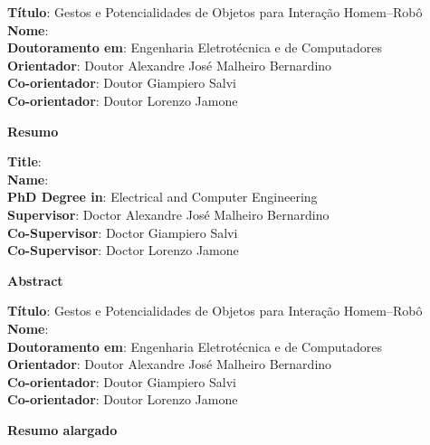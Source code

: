 \documentclass{article}
\newcommand{\alexName}{Alexandre José Malheiro Bernardino}
\newcommand{\giampiName}{Giampiero Salvi}
\newcommand{\loreName}{Lorenzo Jamone}
\newcommand*{\PathFrontmatter}{./1_frontmatter}
\begin{document}
\begin{acronym}
\end{acronym}


\noindent\textbf{Título}: Gestos e Potencialidades de Objetos para Interação Homem--Robô \\
\noindent\textbf{Nome}: \myFullName \\
\noindent\textbf{Doutoramento em}: Engenharia Eletrotécnica e de Computadores \\
\noindent\textbf{Orientador}: Doutor \alexName \\
\noindent\textbf{Co-orientador}: Doutor \giampiName \\
\noindent\textbf{Co-orientador}: Doutor \loreName \\

\bigskip

\noindent\textbf{Resumo}

\bigskip



\newpage

\noindent\textbf{Title}: \myThesisTitle \\
\noindent\textbf{Name}: \myFullName \\
\noindent\textbf{PhD Degree in}: Electrical and Computer Engineering \\
\noindent\textbf{Supervisor}: Doctor \alexName \\
\noindent\textbf{Co-Supervisor}: Doctor \giampiName \\
\noindent\textbf{Co-Supervisor}: Doctor \loreName \\

\bigskip

\noindent\textbf{Abstract}

\bigskip



\newpage

\noindent\textbf{Título}: Gestos e Potencialidades de Objetos para Interação Homem--Robô \\
\noindent\textbf{Nome}: \myFullName \\
\noindent\textbf{Doutoramento em}: Engenharia Eletrotécnica e de Computadores \\
\noindent\textbf{Orientador}: Doutor \alexName \\
\noindent\textbf{Co-orientador}: Doutor \giampiName \\
\noindent\textbf{Co-orientador}: Doutor \loreName \\

\bigskip

\noindent\textbf{Resumo alargado}

\bigskip


\end{document}
